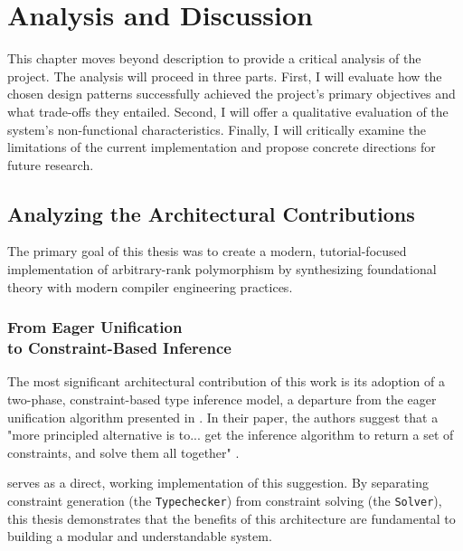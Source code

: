 \chapter{Analysis and Discussion}
\label{chap:AnalysisAndDiscussion}

This chapter moves beyond description to provide a critical analysis of the \Arralac project. The analysis will proceed in three parts. First, I will evaluate how the chosen design patterns successfully achieved the project's primary objectives and what trade-offs they entailed. Second, I will offer a qualitative evaluation of the system's non-functional characteristics. Finally, I will critically examine the limitations of the current implementation and propose concrete directions for future research.

\section{Analyzing the Architectural Contributions}
\label{sec:Discussion:Objectives}

The primary goal of this thesis was to create a modern, tutorial-focused implementation of arbitrary-rank polymorphism by synthesizing foundational theory with modern compiler engineering practices.

\subsection[From Eager Unification to Constraint-Based Inference]{From Eager Unification \\ to Constraint-Based Inference}
The most significant architectural contribution of this work is its adoption of a two-phase, constraint-based type inference model, a departure from the eager unification algorithm presented in \cite{jones-practical-2007}. In their paper, the authors suggest that a "more principled alternative is to... get the inference algorithm to return a set of constraints, and solve them all together" \cite[Sec. 9.6]{jones-practical-2007}.

\Arralac serves as a direct, working implementation of this suggestion. By separating constraint generation (the \texttt{Typechecker}) from constraint solving (the \texttt{Solver}), this thesis demonstrates that the benefits of this architecture are fundamental to building a modular and understandable system.

